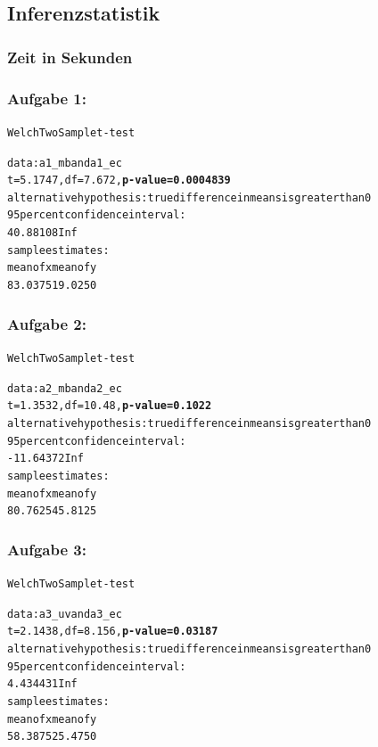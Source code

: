 \documentclass[a4paper,10pt]{scrartcl}
\begin{document}
\subsection{Inferenzstatistik}

\subsubsection*{Zeit in Sekunden} 

\subsubsection*{Aufgabe 1:}

\begin{alltt}
Welch Two Sample t-test

data:  a1_mb and a1_ec 
t = 5.1747, df = 7.672, \textbf{p-value = 0.0004839}
alternative hypothesis: true difference in means is greater than 0 
95 percent confidence interval:
 40.88108      Inf 
sample estimates:
mean of x mean of y 
  83.0375   19.0250 
\end{alltt} 

\subsubsection*{Aufgabe 2:}

\begin{alltt}
Welch Two Sample t-test

data:  a2_mb and a2_ec 
t = 1.3532, df = 10.48, \textbf{p-value = 0.1022}
alternative hypothesis: true difference in means is greater than 0 
95 percent confidence interval:
 -11.64372       Inf 
sample estimates:
mean of x mean of y 
  80.7625   45.8125 
\end{alltt} 

\subsubsection*{Aufgabe 3:}

\begin{alltt}
Welch Two Sample t-test

data:  a3_uv and a3_ec 
t = 2.1438, df = 8.156, \textbf{p-value = 0.03187}
alternative hypothesis: true difference in means is greater than 0 
95 percent confidence interval:
 4.434431      Inf 
sample estimates:
mean of x mean of y 
  58.3875   25.4750 
\end{alltt} 
\end{document}
